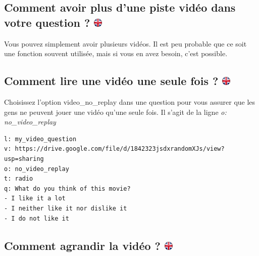 \documentclass[
]{book}
\begin{document}
\hypertarget{comment-avoir-plus-dune-piste-viduxe9o-dans-votre-question}{%
\subsection[Comment avoir plus d'une piste vidéo dans votre question ? ]{\texorpdfstring{Comment avoir plus d'une piste vidéo dans votre question ? \href{https://www.psytoolkit.org/lessons/surveyaudiovideo.html\#_how_to_have_more_than_one_audio_track_in_your_question}{\protect\includegraphics{img/ukflag.png}}}{Comment avoir plus d'une piste vidéo dans votre question ? }}\label{comment-avoir-plus-dune-piste-viduxe9o-dans-votre-question}}

Vous pouvez simplement avoir plusieurs vidéos. Il est peu probable que ce soit une fonction souvent utilisée, mais si vous en avez besoin, c'est possible.

\hypertarget{comment-lire-une-viduxe9o-une-seule-fois}{%
\subsection[Comment lire une vidéo une seule fois ? ]{\texorpdfstring{Comment lire une vidéo une seule fois ? \href{https://www.psytoolkit.org/lessons/surveyaudiovideo.html\#_how_to_play_a_video_only_one_time}{\protect\includegraphics{img/ukflag.png}}}{Comment lire une vidéo une seule fois ? }}\label{comment-lire-une-viduxe9o-une-seule-fois}}

Choisissez l'option video\_no\_replay dans une question pour vous assurer que les gens ne peuvent jouer une vidéo qu'une seule fois. Il s'agit de la ligne \emph{o: no\_video\_replay}

\begin{verbatim}
l: my_video_question
v: https://drive.google.com/file/d/1842323jsdxrandomXJs/view?usp=sharing
o: no_video_replay
t: radio
q: What do you think of this movie?
- I like it a lot
- I neither like it nor dislike it
- I do not like it
\end{verbatim}

\hypertarget{comment-agrandir-la-viduxe9o}{%
\subsection[Comment agrandir la vidéo ? ]{\texorpdfstring{Comment agrandir la vidéo ? \href{https://www.psytoolkit.org/lessons/surveyaudiovideo.html\#_how_to_make_the_video_larger}{\protect\includegraphics{img/ukflag.png}}}{Comment agrandir la vidéo ? }}\label{comment-agrandir-la-viduxe9o}}
\end{document}
